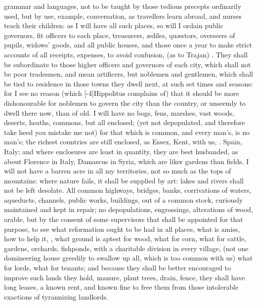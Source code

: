 grammar and languages, not to be taught by those tedious precepts
ordinarily used, but by use, example, conversation, as travellers
learn abroad, and nurses teach their children: as I will have all such
places, so will I ordain public governors, fit officers to each
place, treasurers, \ae{}diles, qu\ae{}stors, overseers of pupils, widows'
goods, and all public houses, \etc{} and those once a year to make strict
accounts of all receipts, expenses, to avoid confusion,  (as \Pliny{} to Trajan) . They shall be
subordinate to those higher officers and governors of each city, which
shall not be poor tradesmen, and mean artificers, but noblemen and
gentlemen, which shall be tied to residence in those towns they dwell
next, at such set times and seasons: for I see no reason (which
[-4\baselineskip]Hippolitus complains of) that it should be more dishonourable for
noblemen to govern the city than the country, or unseemly to dwell
there now, than of old. I will have no bogs, fens, marshes, vast
woods, deserts, heaths, commons, but all enclosed; (yet not
depopulated, and therefore take heed you mistake me not) for that which
is common, and every man's, is no man's; the richest countries are
still enclosed, as Essex, Kent, with us, \etc{}. Spain, Italy; and where
enclosures are least in quantity, they are best husbanded, as
about Florence in Italy, Damascus in Syria, \etc{} which are liker gardens
than fields. I will not have a barren acre in all my territories, not
so much as the tops of mountains: where nature fails, it shall be
supplied by art: lakes and rivers shall not be left desolate. All
common highways, bridges, banks, corrivations of waters, aqueducts,
channels, public works, buildings, \etc{} out of a common stock,
curiously maintained and kept in repair; no depopulations, engrossings,
alterations of wood, arable, but by the consent of some supervisors
that shall be appointed for that purpose, to see what reformation ought
to be had in all places, what is amiss, how to help it, , what ground is aptest for wood,
what for corn, what for cattle, gardens, orchards, fishponds, \etc{} with
a charitable division in every village, (not one domineering house
greedily to swallow up all, which is too common with us) what for
lords, what for tenants; and because they shall be better
encouraged to improve such lands they hold, manure, plant trees, drain,
fence, \etc{} they shall have long leases, a known rent, and known fine to
free them from those intolerable exactions of tyrannizing landlords.

